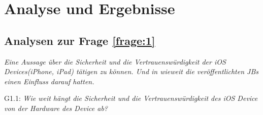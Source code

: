 %
%
%
% 


\chapter{Analyse und Ergebnisse}
\label{ch:Ergebnisse}


\section{Analysen zur Frage \ref{frage:1}}
\label{sec:Frage1}
\textit{\glqq Eine Aussage über die Sicherheit und die Vertrauenswürdigkeit der iOS Devices(iPhone, iPad) tätigen zu können. Und in wieweit die veröffentlichten JBs einen Einfluss darauf hatten. \grqq{}}

G1.1: \textit{\glqq Wie weit hängt die Sicherheit und die Vertrauenswürdigkeit des iOS Device von der Hardware des Device ab?\grqq{}}

